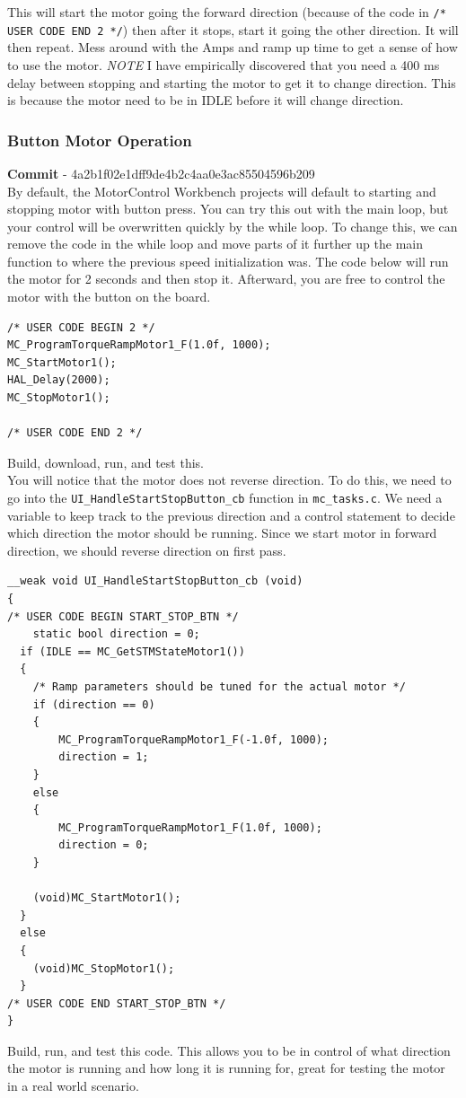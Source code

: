 \documentclass[10pt]{article}
\begin{document}
                This will start the motor going the forward direction (because of the code in \texttt{/* USER CODE END 2 */}) then after it stops, start it going the other direction. It will then repeat. Mess around with the Amps and ramp up time to get a sense of how to use the motor. \emph{NOTE} I have empirically discovered that you need a 400 ms delay between stopping and starting the motor to get it to change direction. This is because the motor need to be in IDLE before it will change direction.
			\FloatBarrier \subsubsection{Button Motor Operation}
                    \textbf{Commit} - 4a2b1f02e1dff9de4b2c4aa0e3ac85504596b209 \\
                    By default, the MotorControl Workbench projects will default to starting and stopping motor with button press. You can try this out with the main loop, but your control will be overwritten quickly by the while loop. To change this, we can remove the code in the while loop and move parts of it further up the main function to where the previous speed initialization was. The code below will run the motor for 2 seconds and then stop it. Afterward, you are free to control the motor with the button on the board.
                    \begin{verbatim}
/* USER CODE BEGIN 2 */
MC_ProgramTorqueRampMotor1_F(1.0f, 1000);
MC_StartMotor1();
HAL_Delay(2000);
MC_StopMotor1();

/* USER CODE END 2 */
                    \end{verbatim}
                    Build, download, run, and test this. \\
                    You will notice that the motor does not reverse direction. To do this, we need to go into the \texttt{UI\_HandleStartStopButton\_cb} function in \texttt{mc\_tasks.c}. We need a variable to keep track to the previous direction and a control statement to decide which direction the motor should be running. Since we start motor in forward direction, we should reverse direction on first pass.
                    \begin{verbatim}
__weak void UI_HandleStartStopButton_cb (void)
{
/* USER CODE BEGIN START_STOP_BTN */
    static bool direction = 0;
  if (IDLE == MC_GetSTMStateMotor1())
  {
    /* Ramp parameters should be tuned for the actual motor */
    if (direction == 0)
    {
        MC_ProgramTorqueRampMotor1_F(-1.0f, 1000);
        direction = 1;
    }
    else
    {
        MC_ProgramTorqueRampMotor1_F(1.0f, 1000);
        direction = 0;
    }

    (void)MC_StartMotor1();
  }
  else
  {
    (void)MC_StopMotor1();
  }
/* USER CODE END START_STOP_BTN */
}
                    \end{verbatim}
                    Build, run, and test this code. This allows you to be in control of what direction the motor is running and how long it is running for, great for testing the motor in a real world scenario. 
\end{document}
